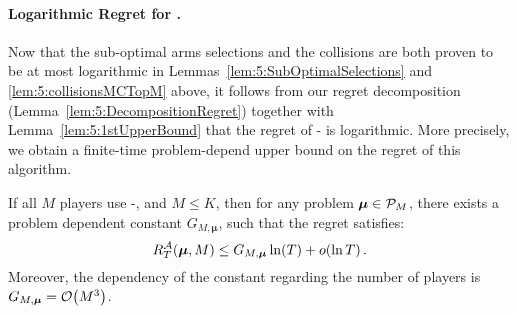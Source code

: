 

\paragraph{Logarithmic Regret for \MCTopM.}
%
Now that the sub-optimal arms selections and the collisions
are both proven to be at most logarithmic in Lemmas~\ref{lem:5:SubOptimalSelections} and \ref{lem:5:collisionsMCTopM} above,
it follows from our regret decomposition (Lemma~\ref{lem:5:DecompositionRegret}) together with Lemma~\ref{lem:5:1stUpperBound} that the regret of \MCTopM-\klUCB{} is logarithmic. More precisely, we obtain a finite-time problem-depend upper bound on the regret of this algorithm.

\begin{theorem}\label{thm:5:LogarithmicRegret_MCTopMklUCB}
\begin{leftbar}[theorembar]  %
  If all $M$ players use
  \MCTopM-\klUCB, and $M \leq K$,
  then for any problem $\boldsymbol{\mu} \in \mathcal{P}_M$,
  there exists a problem dependent constant $G_{M,\boldsymbol{\mu}}$, such that
  the regret satisfies:
  \begin{equation}\label{eq:5:LogarithmicRegret_MCTopMklUCB}
    R_T^{\mathcal{A}}(\boldsymbol{\mu}, M) \leq G_{M,\boldsymbol{\mu}} \ln(T) + \mathop{}\mathopen{}o\mathopen{}\left(\ln T\right).
  \end{equation}
  Moreover, the dependency of the constant regarding the number of players is $G_{M,\boldsymbol{\mu}} = \mathop{}\mathopen{}\mathcal{O}\mathopen{}\left(M^3\right)$.
\end{leftbar}  %
\end{theorem}


